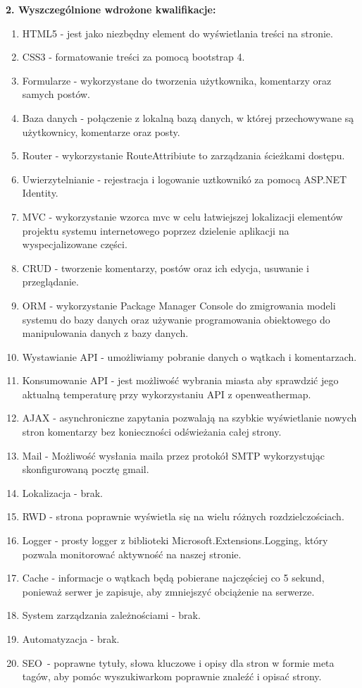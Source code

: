 \documentclass[12pt]{article}
\renewcommand{\_}{\kern-1.5pt\textunderscore\kern-1.5pt}
\begin{document}
\vspace{\baselineskip}
\textbf{2. Wyszczególnione wdrożone kwalifikacje:}
\setlength{\parskip}{0.0pt}
\begin{enumerate}
	\item HTML5 - jest jako niezbędny element do wyświetlania treści na stronie.
	\item CSS3 - formatowanie treści za pomocą bootstrap 4.
	\item Formularze - wykorzystane do tworzenia użytkownika, komentarzy oraz samych postów.
	\item Baza danych - połączenie z lokalną bazą danych, w której przechowywane są użytkownicy, komentarze oraz posty.
	\item Router - wykorzystanie RouteAttribiute to zarządzania ścieżkami dostępu.
	\item Uwierzytelnianie - rejestracja i logowanie uztkownikó za pomocą ASP.NET Identity.
	\item MVC - wykorzystanie wzorca mvc w celu łatwiejszej lokalizacji elementów projektu systemu internetowego poprzez dzielenie aplikacji na wyspecjalizowane części.
	\item CRUD - tworzenie komentarzy, postów oraz ich edycja, usuwanie i przeglądanie. \tab 
	\item ORM - wykorzystanie Package Manager Console do zmigrowania modeli systemu do bazy danych oraz używanie programowania obiektowego do manipulowania danych z bazy danych.
	\item Wystawianie API - umożliwiamy pobranie danych o wątkach i komentarzach.\tab 
	\item Konsumowanie API - jest możliwość wybrania miasta aby sprawdzić jego aktualną temperaturę przy wykorzystaniu API z openweathermap.
	\item AJAX - asynchroniczne zapytania pozwalają na szybkie wyświetlanie nowych \tab stron komentarzy bez konieczności odświeżania całej strony.
	\item Mail - Możliwość wysłania maila przez protokół SMTP wykorzystując \tab skonfigurowaną pocztę gmail.
	\item Lokalizacja - brak.
	\item RWD - strona poprawnie wyświetla się na wielu różnych rozdzielczościach.
	\item Logger - prosty logger z biblioteki Microsoft.Extensions.Logging, który pozwala monitorować aktywność na naszej stronie.
	\item Cache \tab - informacje o wątkach będą pobierane najczęściej co 5 sekund, ponieważ serwer je zapisuje, aby zmniejszyć obciążenie na serwerze.
	\item System zarządzania zależnościami - brak.
	\item Automatyzacja - brak.
\setlength{\parskip}{12.0pt}
	\item SEO\ - poprawne tytuły, słowa kluczowe i opisy dla stron w formie meta tagów, aby pomóc wyszukiwarkom poprawnie znaleźć i opisać strony.  
\end{enumerate}
\end{document}
